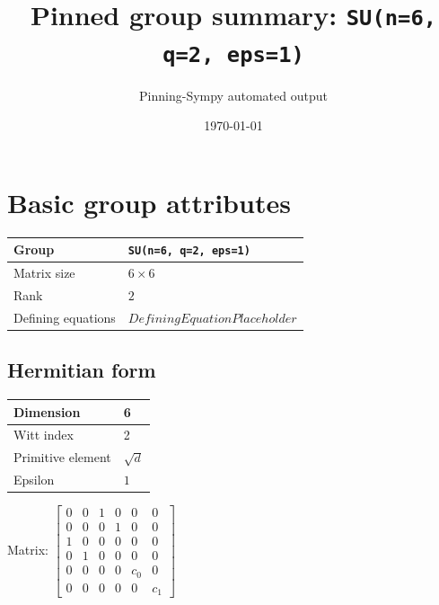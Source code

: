 \documentclass[11pt]{article}
\title{Pinned group summary: \texttt{SU(n=6, q=2, eps=1)}}
\author{Pinning-Sympy automated output}
\date{\today}
\theoremstyle{definition}
\begin{document}
\maketitle
\tableofcontents

\newpage

\section{Basic group attributes}

\begin{tabular}{|l|l|}
	\hline
    Group & \texttt{SU(n=6, q=2, eps=1)} \\
	\hline
    Matrix size & $6 \times 6$ \\
	\hline
    Rank & $2$ \\
	\hline
	Defining equations & $DefiningEquationPlaceholder$ \\
	\hline
\end{tabular}

\subsection{Hermitian form}
\begin{tabular}{|l|l|}
    \hline
    Dimension & 6 \\
    \hline
    Witt index & 2 \\
    \hline
    Primitive element & $\sqrt{d}$ \\
    \hline
    Epsilon & $1$ \\
    \hline
\end{tabular}

\bigskip
\noindent Matrix: \(
\left[\begin{matrix}0 & 0 & 1 & 0 & 0 & 0\\0 & 0 & 0 & 1 & 0 & 0\\1 & 0 & 0 & 0 & 0 & 0\\0 & 1 & 0 & 0 & 0 & 0\\0 & 0 & 0 & 0 & c_{0} & 0\\0 & 0 & 0 & 0 & 0 & c_{1}\end{matrix}\right]
\)
\end{document}
